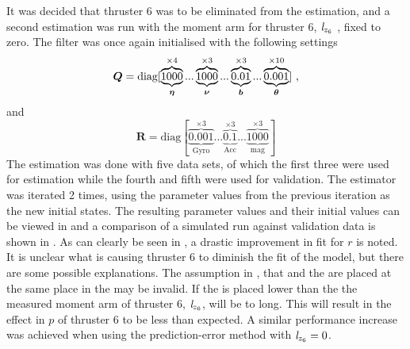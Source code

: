 It was decided that thruster 6 was to be eliminated from the estimation, and a second estimation was run with the moment arm for thruster 6, $\mathit{l}_{z_{6}}$ , fixed to zero. The filter was once again initialised with the following settings
\begin{equation*}
\boldsymbol{Q}=\text{diag}[\underbrace{\overbrace{1000}^{\times4}}_{\boldsymbol{\eta}}... \underbrace{\overbrace{1000}^{\times3}}_{\boldsymbol{\nu}}...\underbrace{\overbrace{0.01}^{\times3}}_{\boldsymbol{b}}... \underbrace{\overbrace{0.001}^{\times10}}_{\boldsymbol{\theta}}]\text{ ,}
\end{equation*}
and
\begin{equation*}
\boldsymbol{R} = \text{diag}[\underbrace{\overbrace{0.001}^{\times3}}_{\text{Gyro}}... \underbrace{\overbrace{0.1}^{\times3}}_{\text{Acc}}... \underbrace{\overbrace{1000}^{\times3}}_{\text{mag}}]
\end{equation*} 
The estimation was done with five data sets, of which the first three were used for estimation while the fourth and fifth were used for validation. The estimator was iterated 2 times, using the parameter values from the previous iteration as the new initial states. The resulting parameter values and their initial values can be viewed in  and a comparison of a simulated run against validation data is shown in . As can clearly be seen in , a drastic improvement in fit for $r$ is noted. It is unclear what is causing thruster 6 to diminish the fit of the model, but there are some possible explanations. The assumption in , that \abbrCG and the \abbrCO are placed at the same place in the \abbrROV may be invalid. If the \abbrCG is placed lower than the \abbrCO the measured moment arm of thruster 6, $\mathit{l}_{z_{6}}$, will be to long. This will result in the effect in $p$ of thruster 6 to be less than expected. A similar performance increase was achieved when using the prediction-error method with $\mathit{l}_{z_{6}}=0$.

